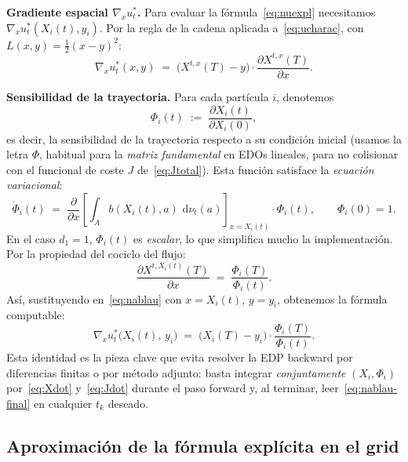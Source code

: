 \documentclass[11pt, a4paper]{article}
\theoremstyle{definition}
\newcommand{\dee}{\,\mathrm{d}}
\begin{document}
\medskip

\textbf{Gradiente espacial $\nabla_x u_t^*$.} Para evaluar la
fórmula~\eqref{eq:nuexpl} necesitamos
$\nabla_x u_t^*(X_i(t), y_i)$. Por la regla de la cadena
aplicada a~\eqref{eq:ucharac}, con $L(x, y) = \tfrac{1}{2}(x - y)^2$:
\begin{equation}
  \nabla_x u_t^*(x, y)
  \;=\;
  \bigl( X^{t, x}(T) - y \bigr)
  \cdot
  \frac{\partial X^{t, x}(T)}{\partial x}.
  \label{eq:nablau}
\end{equation}

\textbf{Sensibilidad de la trayectoria.} Para cada partícula $i$,
denotemos
\begin{equation}
  \Phi_i(t) \;:=\; \frac{\partial X_i(t)}{\partial X_i(0)},
\end{equation}
es decir, la sensibilidad de la trayectoria respecto a su condición
inicial (usamos la letra $\Phi$, habitual para la \emph{matriz
fundamental} en EDOs lineales, para no colisionar con el funcional de
coste $J$ de~\eqref{eq:Jtotal}). Esta función satisface la
\emph{ecuación variacional}:
\begin{equation}
  \dot{\Phi}_i(t)
  \;=\;
  \frac{\partial}{\partial x}
  \!\left[
    \int_A b(X_i(t), a) \, \dee\nu_t(a)
  \right]_{x = X_i(t)}
  \cdot \Phi_i(t),
  \qquad
  \Phi_i(0) = 1.
  \label{eq:Jdot}
\end{equation}
En el caso $d_1 = 1$, $\Phi_i(t)$ es \emph{escalar}, lo que simplifica
mucho la implementación. Por la propiedad del cociclo del flujo:
\begin{equation}
  \frac{\partial X^{t, X_i(t)}(T)}{\partial x}
  \;=\;
  \frac{\Phi_i(T)}{\Phi_i(t)}.
\end{equation}
Así, sustituyendo en~\eqref{eq:nablau} con $x = X_i(t)$,
$y = y_i$, obtenemos la fórmula computable:
\begin{equation}
  \boxed{\;
    \nabla_x u_t^*\bigl( X_i(t),\, y_i \bigr)
    \;=\;
    \bigl( X_i(T) - y_i \bigr) \cdot \frac{\Phi_i(T)}{\Phi_i(t)}.
  \;}
  \label{eq:nablau-final}
\end{equation}
Esta identidad es la pieza clave que evita resolver la EDP backward
por diferencias finitas o por método adjunto: basta integrar
\emph{conjuntamente} $(X_i, \Phi_i)$ por~\eqref{eq:Xdot} y~\eqref{eq:Jdot}
durante el paso forward y, al terminar, leer~\eqref{eq:nablau-final}
en cualquier $t_k$ deseado.

\subsection{Aproximación de la fórmula explícita en el grid}
\label{ssec:gibbsdiscret}
\end{document}
